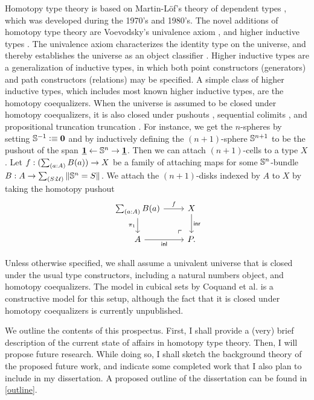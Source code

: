\documentclass[reqno]{amsart}
\begin{document}
Homotopy type theory is based on Martin-L\"of's theory of dependent types \cite{MartinLof84}, which
was developed during the 1970's and 1980's.
The novel additions of homotopy type theory are Voevodsky's univalence axiom \cite{Voevodsky06,Voevodsky10},
and higher inductive types \cite{Lumsdaine11Blog,Shulman11Blog,hottbook}. The univalence axiom characterizes the identity
type on the universe, and thereby establishes the universe as an object classifier \cite{RijkeSpitters}.
Higher inductive types are a generalization of inductive types, in which both
point constructors (generators) and path constructors (relations) may be specified.
A simple class of higher inductive types, which includes most known higher inductive
types, are the homotopy coequalizers. When the universe is assumed to be closed
under homotopy coequalizers, it is also closed under pushouts \cite{hottbook}, 
sequential colimits \cite{hottbook}, and propositional truncation truncation \cite{VanDoorn15}.
For instance, we get the $n$-spheres \cite{Lumsdaine12Blog} by setting $\mathbb{S}^{-1}\vcentcolon\equiv\mathbf{0}$ and
by inductively defining the $(n+1)$-sphere $\mathbb{S}^{n+1}$ to be the pushout
of the span $\underline{\mathbf{1}} \leftarrow\mathbb{S}^{n}\rightarrow\underline{\mathbf{1}}$. 
Then we can attach $(n+1)$-cells to a type $X$.
Let $f:(\sm{a:A}B(a))\to X$ be a family of attaching maps
for some $\mathbb{S}^{n}$-bundle $B:A\to\sm{S:\UU}\brck{\sphere{n}=S}$. We
attach the $(n+1)$-disks indexed by $A$ to $X$ by taking the homotopy pushout
\begin{equation*}
\begin{tikzcd}
\sm{a:A}B(a) \arrow[r,"f"] \arrow[d,swap,"\pi_1"]  & X \arrow[d,"\inr"] \\
A \arrow[r,swap,"\inl"] & P. \arrow[ul,phantom,very near start,"\ulcorner"]
\end{tikzcd}
\end{equation*}

Unless otherwise specified, we shall assume a univalent universe that is closed
under the usual type constructors, including a natural numbers object, and
homotopy coequalizers. The model in cubical sets by Coquand et al. \cite{BezemCoquandHuber} is a
constructive model for this setup, although the fact that it is closed under
homotopy coequalizers is currently unpublished.

We outline the contents of this prospectus. First, I shall provide a (very) brief 
description of the current state of affairs in homotopy type theory. Then,
I will propose future research. While doing so, I shall sketch the background
theory of the proposed future work, and indicate some completed work that I also
plan to include in my dissertation. A proposed outline of the dissertation
can be found in \autoref{outline}.
\end{document}
